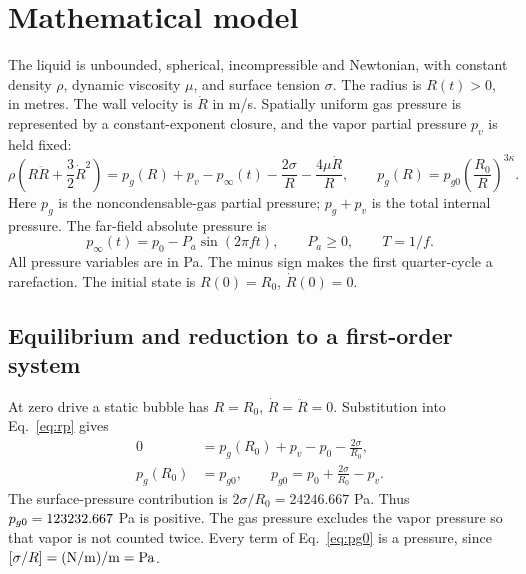 \documentclass[10pt,a4paper]{article}
\newcommand{\Pa}{P_a}
\begin{document}
\section{Mathematical model}
The liquid is unbounded, spherical, incompressible and Newtonian, with constant density $\rho$, dynamic viscosity $\mu$, and surface tension $\sigma$. The radius is $R(t)>0$, in metres. The wall velocity is $\dot R$ in m/s. Spatially uniform gas pressure is represented by a constant-exponent closure, and the vapor partial pressure $p_v$ is held fixed:
\begin{equation}\label{eq:rp}
\rho\left(R\ddot R+\frac32\dot R^2\right)
=p_g(R)+p_v-p_\infty(t)-\frac{2\sigma}{R}-\frac{4\mu\dot R}{R},\qquad
p_g(R)=p_{g0}\left(\frac{R_0}{R}\right)^{3\kappa}.
\end{equation}
Here $p_g$ is the noncondensable-gas partial pressure; $p_g+p_v$ is the total internal pressure. The far-field absolute pressure is
\begin{equation}\label{eq:drive}
p_\infty(t)=p_0-\Pa\sin(2\pi f t),\qquad \Pa\geq0,\qquad T=1/f.
\end{equation}
All pressure variables are in Pa. The minus sign makes the first quarter-cycle a rarefaction. The initial state is $R(0)=R_0$, $\dot R(0)=0$.

\newpage
\subsection{Equilibrium and reduction to a first-order system}
At zero drive a static bubble has $R=R_0$, $\dot R=\ddot R=0$. Substitution into Eq.~\eqref{eq:rp} gives
\begin{align}
0&=p_g(R_0)+p_v-p_0-\frac{2\sigma}{R_0},\\
p_g(R_0)&=p_{g0},\qquad
\boxed{p_{g0}=p_0+\frac{2\sigma}{R_0}-p_v.}\label{eq:pg0}
\end{align}
The surface-pressure contribution is $2\sigma/R_0=24246.667$ Pa. Thus $p_{g0}=123232.667$ Pa is positive. The gas pressure excludes the vapor pressure so that vapor is not counted twice. Every term of Eq.~\eqref{eq:pg0} is a pressure, since $[\sigma/R]=({\rm N/m})/{\rm m}={\rm Pa}$.
\end{document}
